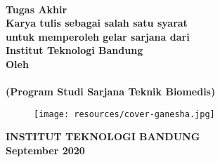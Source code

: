 \clearpage
\pagestyle{empty}


{\selectfont%
\begin{center}
    
    \smallskip
	\renewcommand{\baselinestretch}{1}
	
    \large{\bfseries \MakeUppercase{\thetitle}}
    \\[5\baselineskip]

    \large{\bfseries Tugas Akhir}
    \\[\baselineskip]
	
    \normalsize{ \bfseries
    	Karya tulis sebagai salah satu syarat\\
    	untuk memperoleh gelar sarjana dari\\
    	Institut Teknologi Bandung
	}
    \\[3\baselineskip]

    \normalsize{ \bfseries Oleh\\}
    \large{ 
    	\bfseries \MakeUppercase{\theauthor}\\
    	(Program Studi Sarjana Teknik Biomedis)
	}

    \vfill
    \begin{figure}[h]
        \centering
      	\texttt{[image: resources/cover-ganesha.jpg]}
    \end{figure}
    \vfill

    \large{ \bfseries
	    \uppercase{
	        Institut Teknologi Bandung\\
	    }
    	September 2020
	}

\end{center}
}%

\restoregeometry
\clearpage
